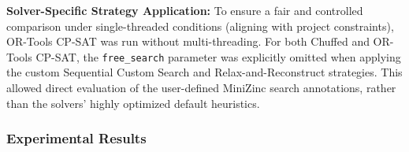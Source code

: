\documentclass{article}
\begin{document}
\textbf{Solver-Specific Strategy Application:}
To ensure a fair and controlled comparison under single-threaded conditions (aligning with project constraints), OR-Tools CP-SAT was run without multi-threading. For both Chuffed and OR-Tools CP-SAT, the \texttt{free\_search} parameter was explicitly omitted when applying the custom Sequential Custom Search and Relax-and-Reconstruct strategies. This allowed direct evaluation of the user-defined MiniZinc search annotations, rather than the solvers' highly optimized default heuristics.


\subsubsection{Experimental Results}

\begin{table}[htbp]
\centering
\small
{}
\caption{CPU time in seconds for finding the \textit{optimal solution} using \textit{Default Search Strategy (Solver's Default)}}
\end{table}
\end{document}
